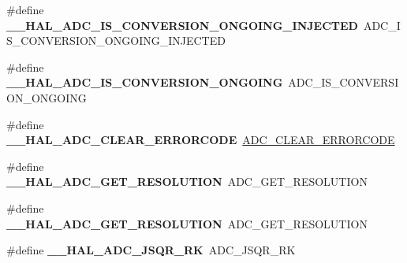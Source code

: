 \begin{DoxyCompactItemize}
\item 
\mbox{\label{group___h_a_l___a_d_c___aliased___macros_ga085a3824fd83a50c46bcc8edaf0f986d}} 
\#define {\bfseries \+\_\+\+\_\+\+H\+A\+L\+\_\+\+A\+D\+C\+\_\+\+I\+S\+\_\+\+C\+O\+N\+V\+E\+R\+S\+I\+O\+N\+\_\+\+O\+N\+G\+O\+I\+N\+G\+\_\+\+I\+N\+J\+E\+C\+T\+ED}~A\+D\+C\+\_\+\+I\+S\+\_\+\+C\+O\+N\+V\+E\+R\+S\+I\+O\+N\+\_\+\+O\+N\+G\+O\+I\+N\+G\+\_\+\+I\+N\+J\+E\+C\+T\+ED
\item 
\mbox{\label{group___h_a_l___a_d_c___aliased___macros_ga64acf0d02a8ef5df5644c4232cef1fca}} 
\#define {\bfseries \+\_\+\+\_\+\+H\+A\+L\+\_\+\+A\+D\+C\+\_\+\+I\+S\+\_\+\+C\+O\+N\+V\+E\+R\+S\+I\+O\+N\+\_\+\+O\+N\+G\+O\+I\+NG}~A\+D\+C\+\_\+\+I\+S\+\_\+\+C\+O\+N\+V\+E\+R\+S\+I\+O\+N\+\_\+\+O\+N\+G\+O\+I\+NG
\item 
\mbox{\label{group___h_a_l___a_d_c___aliased___macros_ga18c93f7ab9df4bb73371bbe50a131d6d}} 
\#define {\bfseries \+\_\+\+\_\+\+H\+A\+L\+\_\+\+A\+D\+C\+\_\+\+C\+L\+E\+A\+R\+\_\+\+E\+R\+R\+O\+R\+C\+O\+DE}~\hyperlink{group___a_d_c___private___macros_gac7ab87a3ab932eed1b3ac5faad4e3aa9}{A\+D\+C\+\_\+\+C\+L\+E\+A\+R\+\_\+\+E\+R\+R\+O\+R\+C\+O\+DE}
\item 
\mbox{\label{group___h_a_l___a_d_c___aliased___macros_gaadc60b61ddd4d5572f3a4c6dbc0520a6}} 
\#define {\bfseries \+\_\+\+\_\+\+H\+A\+L\+\_\+\+A\+D\+C\+\_\+\+G\+E\+T\+\_\+\+R\+E\+S\+O\+L\+U\+T\+I\+ON}~A\+D\+C\+\_\+\+G\+E\+T\+\_\+\+R\+E\+S\+O\+L\+U\+T\+I\+ON
\item 
\mbox{\label{group___h_a_l___a_d_c___aliased___macros_gaadc60b61ddd4d5572f3a4c6dbc0520a6}} 
\#define {\bfseries \+\_\+\+\_\+\+H\+A\+L\+\_\+\+A\+D\+C\+\_\+\+G\+E\+T\+\_\+\+R\+E\+S\+O\+L\+U\+T\+I\+ON}~A\+D\+C\+\_\+\+G\+E\+T\+\_\+\+R\+E\+S\+O\+L\+U\+T\+I\+ON
\item 
\mbox{\label{group___h_a_l___a_d_c___aliased___macros_ga3f3d0f19ef64dab8816b7e4d563da42c}} 
\#define {\bfseries \+\_\+\+\_\+\+H\+A\+L\+\_\+\+A\+D\+C\+\_\+\+J\+S\+Q\+R\+\_\+\+RK}~A\+D\+C\+\_\+\+J\+S\+Q\+R\+\_\+\+RK
\item 

\end{DoxyCompactItemize}
